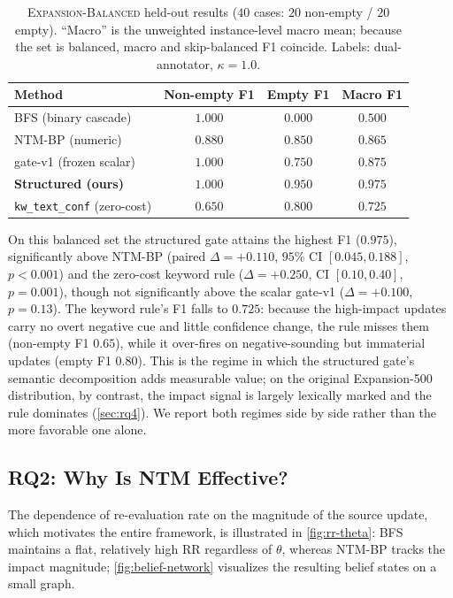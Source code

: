 \documentclass{article}
\theoremstyle{definition}
\begin{document}
\begin{table}[t]
\centering
\caption{\textsc{Expansion-Balanced} held-out results ($40$ cases:
  $20$ non-empty / $20$ empty).  ``Macro'' is the unweighted
  instance-level macro mean; because the set is balanced, macro and
  skip-balanced F1 coincide.  Labels: dual-annotator, $\kappa=1.0$.}
\label{tab:balanced}
\begin{tabular}{lccc}
\toprule
Method & Non-empty F1 & Empty F1 & Macro F1 \\
\midrule
BFS (binary cascade)        & $1.000$ & $0.000$ & $0.500$ \\
NTM-BP (numeric)            & $0.880$ & $0.850$ & $0.865$ \\
gate-v1 (frozen scalar)     & $1.000$ & $0.750$ & $0.875$ \\
\textbf{Structured (ours)}  & $\mathbf{1.000}$ & $\mathbf{0.950}$ & $\mathbf{0.975}$ \\
\texttt{kw\_text\_conf} (zero-cost)  & $0.650$ & $0.800$ & $0.725$ \\
\bottomrule
\end{tabular}
\end{table}

On this balanced set the structured gate attains the highest F1
($0.975$), significantly above NTM-BP (paired $\Delta=+0.110$, $95\%$
CI $[0.045,0.188]$, $p<0.001$) and the zero-cost keyword rule
($\Delta=+0.250$, CI $[0.10,0.40]$, $p=0.001$), though not significantly
above the scalar gate-v1 ($\Delta=+0.100$, $p=0.13$).  The keyword rule's
F1 falls to $0.725$: because the high-impact updates carry no overt
negative cue and little confidence change, the rule misses them
(non-empty F1 $0.65$), while it over-fires on negative-sounding but
immaterial updates (empty F1 $0.80$).  This is the regime in which the
structured gate's semantic decomposition adds measurable value; on the
original Expansion-500 distribution, by contrast, the impact signal is
largely lexically marked and the rule dominates (\cref{sec:rq4}).  We
report both regimes side by side rather than the more favorable one
alone.

\subsection{RQ2: Why Is NTM Effective?}
\label{sec:rq2}

The dependence of re-evaluation rate on the magnitude of the source
update, which motivates the entire framework, is illustrated in
\cref{fig:rr-theta}: BFS maintains a flat, relatively high RR regardless of
$\theta$, whereas NTM-BP tracks the impact magnitude;
\cref{fig:belief-network} visualizes the resulting belief states on a
small graph.
\end{document}
